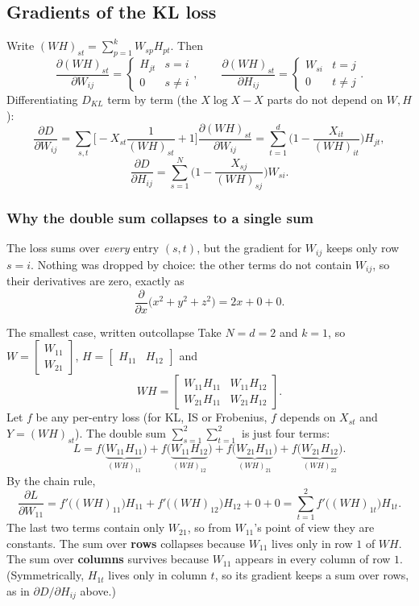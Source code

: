 \documentclass[11pt]{article}
\begin{document}
\subsection{Gradients of the KL loss}

Write $(WH)_{st}=\sum_{p=1}^k W_{sp}H_{pt}$. Then
\[
\frac{\partial (WH)_{st}}{\partial W_{ij}}=\begin{cases}H_{jt}&s=i\\0&s\ne i\end{cases},
\qquad
\frac{\partial (WH)_{st}}{\partial H_{ij}}=\begin{cases}W_{si}&t=j\\0&t\ne j\end{cases}.
\]
Differentiating $D_{KL}$ term by term (the $X\log X-X$ parts do not depend on $W,H$):
\[
\frac{\partial D}{\partial W_{ij}}=\sum_{s,t}\Big[-X_{st}\frac{1}{(WH)_{st}}+1\Big]\frac{\partial(WH)_{st}}{\partial W_{ij}}
=\sum_{t=1}^d\Big(1-\frac{X_{it}}{(WH)_{it}}\Big)H_{jt},
\]
\[
\frac{\partial D}{\partial H_{ij}}=\sum_{s=1}^N\Big(1-\frac{X_{sj}}{(WH)_{sj}}\Big)W_{si}.
\]

\subsubsection*{Why the double sum collapses to a single sum}

The loss sums over \emph{every} entry $(s,t)$, but the gradient for $W_{ij}$ keeps only row $s=i$. Nothing
was dropped by choice: the other terms do not contain $W_{ij}$, so their derivatives are zero, exactly as
\[
\frac{\partial}{\partial x}\big(x^2+y^2+z^2\big)=2x+0+0 .
\]

\begin{example}{The smallest case, written out}{collapse}
Take $N=d=2$ and $k=1$, so $W=\begin{bmatrix}W_{11}\\W_{21}\end{bmatrix}$, $H=\begin{bmatrix}H_{11}&H_{12}\end{bmatrix}$ and
\[
WH=\begin{bmatrix}W_{11}H_{11}&W_{11}H_{12}\\W_{21}H_{11}&W_{21}H_{12}\end{bmatrix}.
\]
Let $f$ be any per-entry loss (for KL, IS or Frobenius, $f$ depends on $X_{st}$ and $Y=(WH)_{st}$). The double sum $\sum_{s=1}^2\sum_{t=1}^2$ is
just four terms:
\[
L=f\big(\underbrace{W_{11}H_{11}}_{(WH)_{11}}\big)+f\big(\underbrace{W_{11}H_{12}}_{(WH)_{12}}\big)+f\big(\underbrace{W_{21}H_{11}}_{(WH)_{21}}\big)+f\big(\underbrace{W_{21}H_{12}}_{(WH)_{22}}\big).
\]
By the chain rule,
\[
\frac{\partial L}{\partial W_{11}}=f'\big((WH)_{11}\big)H_{11}+f'\big((WH)_{12}\big)H_{12}+0+0
=\sum_{t=1}^{2}f'\big((WH)_{1t}\big)H_{1t}.
\]
The last two terms contain only $W_{21}$, so from $W_{11}$'s point of view they are constants. The sum over
\textbf{rows} collapses because $W_{11}$ lives only in row $1$ of $WH$. The sum over \textbf{columns} survives
because $W_{11}$ appears in every column of row $1$. (Symmetrically, $H_{1t}$ lives only in column $t$, so its
gradient keeps a sum over rows, as in $\partial D/\partial H_{ij}$ above.)
\end{example}
\end{document}
